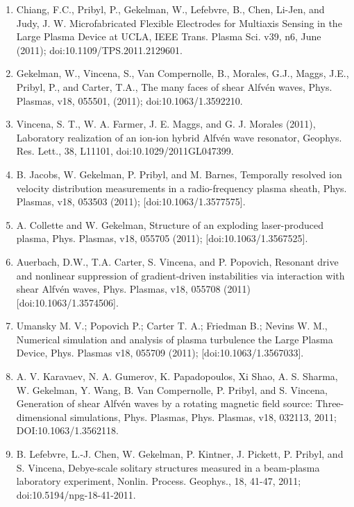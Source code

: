 \documentclass[11pt]{article}
\begin{document}
\begin{enumerate}
\item  Chiang, F.C., Pribyl, P., Gekelman, W., Lefebvre, B., Chen, Li-Jen, and Judy, J. W. Microfabricated Flexible Electrodes for Multiaxis Sensing in the Large Plasma Device at UCLA, IEEE Trans. Plasma Sci. v39, n6, June (2011); doi:10.1109/TPS.2011.2129601.

\item  Gekelman, W., Vincena, S., Van Compernolle, B., Morales, G.J., Maggs, J.E., Pribyl, P., and Carter, T.A., The many faces of shear Alfv\'{e}n waves, Phys. Plasmas, v18, 055501, (2011); doi:10.1063/1.3592210.

\item   Vincena, S. T., W. A. Farmer, J. E. Maggs, and G. J. Morales (2011), Laboratory realization of an ion-ion hybrid Alfv\'{e}n wave resonator, Geophys. Res. Lett., 38, L11101, doi:10.1029/2011GL047399.

\item  B. Jacobs, W. Gekelman, P. Pribyl, and M. Barnes, Temporally resolved ion velocity distribution measurements in a radio-frequency plasma sheath, Phys. Plasmas, v18, 053503 (2011); [doi:10.1063/1.3577575].

\item  A. Collette and W. Gekelman, Structure of an exploding laser-produced plasma, Phys. Plasmas, v18, 055705 (2011); [doi:10.1063/1.3567525].

\item   Auerbach, D.W., T.A. Carter, S. Vincena, and P. Popovich, Resonant drive and nonlinear suppression of gradient-driven instabilities via interaction with shear Alfv\'{e}n waves, Phys. Plasmas, v18, 055708 (2011) [doi:10.1063/1.3574506].

\item Umansky M. V.; Popovich P.; Carter T. A.; Friedman B.; Nevins W. M., Numerical simulation and analysis of plasma turbulence the Large Plasma Device, Phys. Plasmas v18, 055709 (2011); [doi:10.1063/1.3567033].

\item  A. V. Karavaev, N. A. Gumerov, K. Papadopoulos, Xi Shao, A. S. Sharma, W. Gekelman, Y. Wang, B. Van Compernolle, P. Pribyl, and S. Vincena, Generation of shear Alfv\'{e}n waves by a rotating magnetic field source: Three-dimensional simulations, Phys. Plasmas, Phys. Plasmas, v18, 032113, 2011; DOI:10.1063/1.3562118.

\item  B. Lefebvre, L.-J. Chen, W. Gekelman, P. Kintner, J. Pickett, P. Pribyl, and S. Vincena, Debye-scale solitary structures measured in a beam-plasma laboratory experiment, Nonlin. Process. Geophys., 18, 41-47, 2011; doi:10.5194/npg-18-41-2011.


\end{enumerate}
\end{document}
